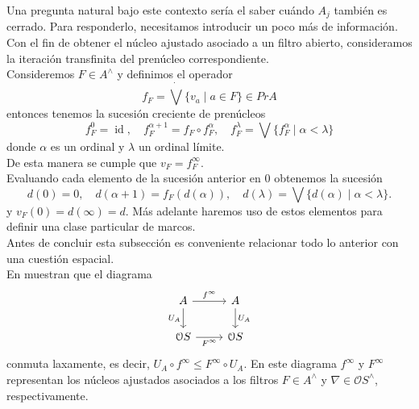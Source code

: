 \documentclass[11pt]{amsart}
\DeclareMathOperator{\id}{id}
\theoremstyle{plain}
\theoremstyle{definition}
\begin{document}
Una pregunta natural bajo este contexto sería el saber cuándo
$A_j$ también es cerrado. Para responderlo, necesitamos introducir un poco más de información.\\

Con el fin de obtener el núcleo ajustado asociado a un filtro abierto, consideramos la iteración transfinita del prenúcleo correspondiente.\\

Consideremos $F\in A^\wedge$ y definimos el operador
\begin{equation}\label{Prenucleo}
f_{F}=\dot{\bigvee}\{v_a\mid a\in F\}\in PrA
\end{equation}
entonces  tenemos la sucesión creciente de prenúcleos
\begin{equation}\label{Sucesionf}
f_F^0=\id,\quad f_F^{\alpha +1}=f_F\circ f_F^\alpha,\quad f_F^\lambda=\bigvee\{f_F^\alpha\mid \alpha<\lambda\}
\end{equation}
donde $\alpha$ es un ordinal y $\lambda$ un ordinal límite.\\

De esta manera se cumple que $v_F=f_F^\infty$.\\

Evaluando cada elemento de la sucesión anterior en $0$ obtenemos la sucesión
\begin{equation}\label{Sucesiond}
d(0)=0,\quad d(\alpha + 1)=f_F(d(\alpha)),\quad d(\lambda)=\bigvee\{d(\alpha)\mid \alpha<\lambda\}.
\end{equation}
y $v_F(0)=d(\infty)=d$. Más adelante haremos uso de estos elementos para definir una clase particular de marcos.\\

Antes de concluir esta subsección es conveniente relacionar todo lo anterior con una cuestión espacial.\\

En \cite[Lema 8.9 y Corolario 8.10]{simmons2004vietoris} muestran que el diagrama
\[\begin{tikzcd}
	A & A \\
	{\mathcal{O}S} & {\mathcal{O}S}
	\arrow["{f^\infty}", from=1-1, to=1-2]
	\arrow["{U_A}"', from=1-1, to=2-1]
	\arrow["{U_A}", from=1-2, to=2-2]
	\arrow["{F^\infty}"', from=2-1, to=2-2]
\end{tikzcd}\]
conmuta laxamente, es decir, $U_A\circ f^\infty\leq F^\infty \circ U_A$. En este diagrama $f^\infty$ y $F^\infty$ representan los
núcleos ajustados asociados a los filtros $F\in A^\wedge$ y $\nabla\in \mathcal{O}S^\wedge$, respectivamente.\\
\end{document}
